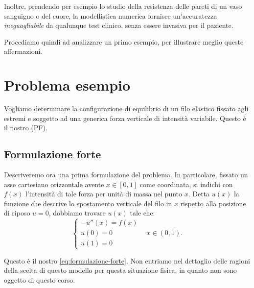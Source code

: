 Inoltre, prendendo per esempio lo studio della resistenza delle pareti di un vaso sanguigno o del cuore, la modellistica numerica fornisce un'accuratezza \textit{ineguagliabile} da qualunque test clinico, senza essere invasiva per il paziente.

Procediamo quindi ad analizzare un primo esempio, per illustrare meglio queste affermazioni.

\section{Problema esempio}
Vogliamo determinare la configurazione di equilibrio di un filo elastico fissato agli estremi e soggetto ad una generica forza verticale di intensità variabile. Questo è il nostro (PF).

\subsection{Formulazione forte}
Descriveremo ora una prima formulazione del problema.
In particolare, fissato un asse cartesiano orizzontale avente $x \in [0,1]$ come coordinata, si indichi con $f(x)$ l'intensità di tale forza per unità di massa nel punto $x$.
Detta $u(x)$ la funzione che descrive lo spostamento verticale del filo in $x$ rispetto alla posizione di riposo $u=0$, dobbiamo trovare $u(x)$ tale che:
\begin{equation}\tag{PM}
	\begin{cases}
		-u''(x) =f(x) \\
		u(0) =0        \\
		u(1) =0
	\end{cases} \ \ \ \ x\in ( 0,1) .
	\label{eq:formulazione-forte}
\end{equation}

Questo è il nostro \eqref{eq:formulazione-forte}.
Non entriamo nel dettaglio delle ragioni della scelta di questo modello per questa situazione fisica, in quanto non sono oggetto di questo corso.

